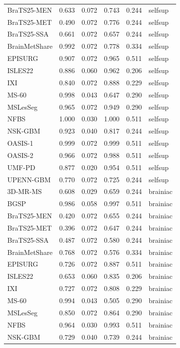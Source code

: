 \begin{tabular}{lrrrrl}
BraTS25-MEN & 0.633 & 0.072 & 0.743 & 0.244 & selfsup \\
BraTS25-MET & 0.490 & 0.072 & 0.776 & 0.244 & selfsup \\
BraTS25-SSA & 0.661 & 0.072 & 0.657 & 0.244 & selfsup \\
BrainMetShare & 0.992 & 0.072 & 0.778 & 0.334 & selfsup \\
EPISURG & 0.907 & 0.072 & 0.965 & 0.511 & selfsup \\
ISLES22 & 0.886 & 0.060 & 0.962 & 0.206 & selfsup \\
IXI & 0.840 & 0.072 & 0.888 & 0.229 & selfsup \\
MS-60 & 0.998 & 0.043 & 0.647 & 0.290 & selfsup \\
MSLesSeg & 0.965 & 0.072 & 0.949 & 0.290 & selfsup \\
NFBS & 1.000 & 0.030 & 1.000 & 0.511 & selfsup \\
NSK-GBM & 0.923 & 0.040 & 0.817 & 0.244 & selfsup \\
OASIS-1 & 0.999 & 0.072 & 0.999 & 0.511 & selfsup \\
OASIS-2 & 0.966 & 0.072 & 0.988 & 0.511 & selfsup \\
UMF-PD & 0.877 & 0.020 & 0.954 & 0.511 & selfsup \\
UPENN-GBM & 0.770 & 0.072 & 0.725 & 0.244 & selfsup \\
3D-MR-MS & 0.608 & 0.029 & 0.659 & 0.244 & brainiac \\
BGSP & 0.986 & 0.058 & 0.997 & 0.511 & brainiac \\
BraTS25-MEN & 0.420 & 0.072 & 0.655 & 0.244 & brainiac \\
BraTS25-MET & 0.396 & 0.072 & 0.647 & 0.244 & brainiac \\
BraTS25-SSA & 0.487 & 0.072 & 0.580 & 0.244 & brainiac \\
BrainMetShare & 0.768 & 0.072 & 0.576 & 0.334 & brainiac \\
EPISURG & 0.726 & 0.072 & 0.887 & 0.511 & brainiac \\
ISLES22 & 0.653 & 0.060 & 0.835 & 0.206 & brainiac \\
IXI & 0.727 & 0.072 & 0.808 & 0.229 & brainiac \\
MS-60 & 0.994 & 0.043 & 0.505 & 0.290 & brainiac \\
MSLesSeg & 0.850 & 0.072 & 0.864 & 0.290 & brainiac \\
NFBS & 0.964 & 0.030 & 0.993 & 0.511 & brainiac \\
NSK-GBM & 0.729 & 0.040 & 0.739 & 0.244 & brainiac \\

\end{tabular}
